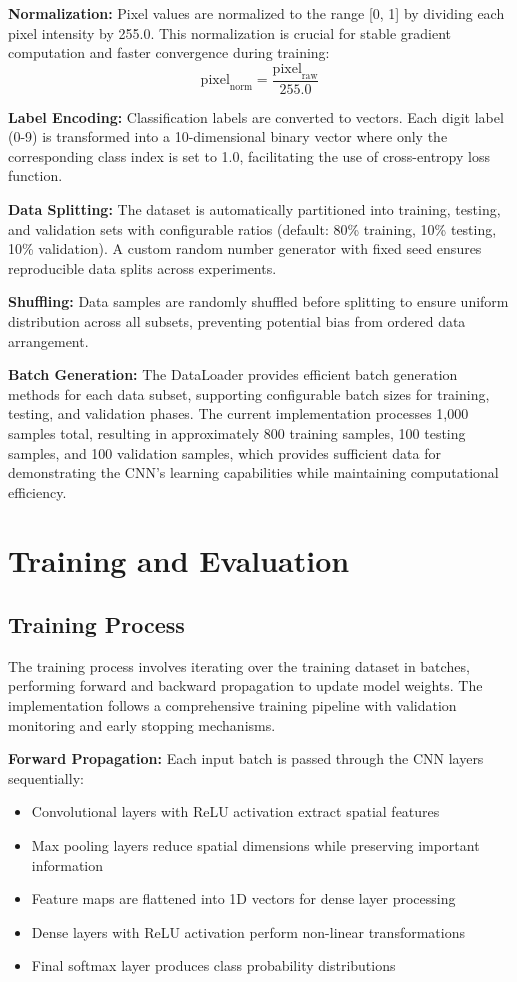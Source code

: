 \documentclass[conference]{IEEEtran}
\begin{document}
\textbf{Normalization:} Pixel values are normalized to the range [0, 1] by dividing each pixel intensity by 255.0. This normalization is crucial for stable gradient computation and faster convergence during training:
\begin{equation}
\text{pixel}_{\text{norm}} = \frac{\text{pixel}_{\text{raw}}}{255.0}
\end{equation}

\textbf{Label Encoding:} Classification labels are converted to vectors. Each digit label (0-9) is transformed into a 10-dimensional binary vector where only the corresponding class index is set to 1.0, facilitating the use of cross-entropy loss function.

\textbf{Data Splitting:} The dataset is automatically partitioned into training, testing, and validation sets with configurable ratios (default: 80\% training, 10\% testing, 10\% validation). A custom random number generator with fixed seed ensures reproducible data splits across experiments.

\textbf{Shuffling:} Data samples are randomly shuffled before splitting to ensure uniform distribution across all subsets, preventing potential bias from ordered data arrangement.

\textbf{Batch Generation:} The DataLoader provides efficient batch generation methods for each data subset, supporting configurable batch sizes for training, testing, and validation phases. The current implementation processes 1,000 samples total, resulting in approximately 800 training samples, 100 testing samples, and 100 validation samples, which provides sufficient data for demonstrating the CNN's learning capabilities while maintaining computational efficiency.

\section{Training and Evaluation}
\subsection{Training Process}
The training process involves iterating over the training dataset in batches, performing forward and backward propagation to update model weights. The implementation follows a comprehensive training pipeline with validation monitoring and early stopping mechanisms.

\textbf{Forward Propagation:} Each input batch is passed through the CNN layers sequentially:
\begin{itemize}
\item Convolutional layers with ReLU activation extract spatial features
\item Max pooling layers reduce spatial dimensions while preserving important information
\item Feature maps are flattened into 1D vectors for dense layer processing
\item Dense layers with ReLU activation perform non-linear transformations
\item Final softmax layer produces class probability distributions
\end{itemize}
\end{document}
